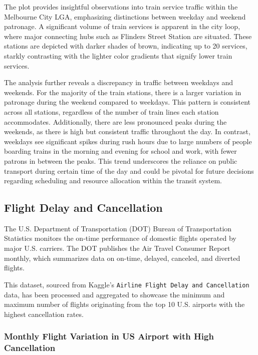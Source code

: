 The plot provides insightful observations into train service traffic within the Melbourne City LGA, emphasizing distinctions between weekday and weekend patronage. A significant volume of train services is apparent in the city loop, where major connecting hubs such as Flinders Street Station are situated. These stations are depicted with darker shades of brown, indicating up to 20 services, starkly contrasting with the lighter color gradients that signify lower train services.

The analysis further reveals a discrepancy in traffic between weekdays and weekends. For the majority of the train stations, there is a larger variation in patronage during the weekend compared to weekdays. This pattern is consistent across all stations, regardless of the number of train lines each station accommodates. Additionally, there are less pronounced peaks during the weekends, as there is high but consistent traffic throughout the day. In contrast, weekdays see significant spikes during rush hours due to large numbers of people boarding trains in the morning and evening for school and work, with fewer patrons in between the peaks. This trend underscores the reliance on public transport during certain time of the day and could be pivotal for future decisions regarding scheduling and resource allocation within the transit system.

\hypertarget{flight-delay-and-cancellation}{%
\subsection{Flight Delay and Cancellation}\label{flight-delay-and-cancellation}}

The U.S. Department of Transportation (DOT) Bureau of Transportation Statistics monitors the on-time performance of domestic flights operated by major U.S. carriers. The DOT publishes the Air Travel Consumer Report monthly, which summarizes data on on-time, delayed, canceled, and diverted flights.

This dataset, sourced from Kaggle's \texttt{Airline\ Flight\ Delay\ and\ Cancellation} data, has been processed and aggregated to showcase the minimum and maximum number of flights originating from the top 10 U.S. airports with the highest cancellation rates.

\hypertarget{monthly-flight-variation-in-us-airport-with-high-cancellation}{%
\subsubsection{Monthly Flight Variation in US Airport with High Cancellation}\label{monthly-flight-variation-in-us-airport-with-high-cancellation}}

